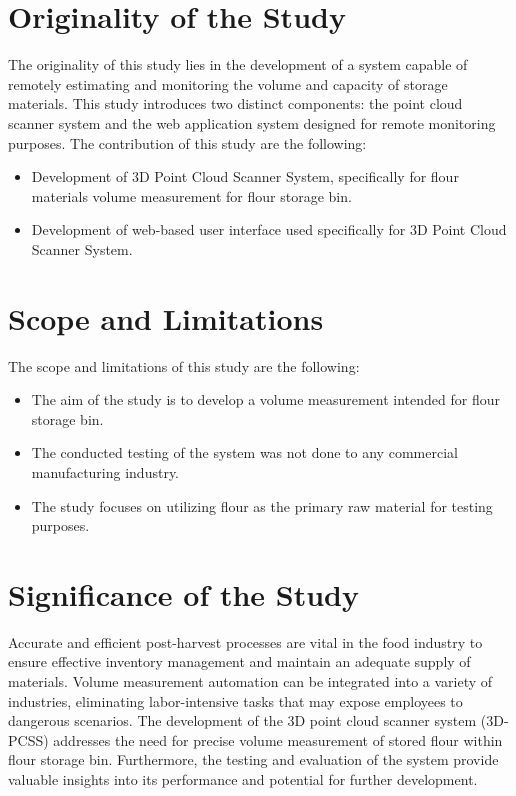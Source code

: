 \section{Originality of the Study}
\label{intro:sec:Originality of the Study}
The originality of this study lies in the development of a system capable of remotely estimating and monitoring the volume and capacity of storage materials. This study introduces two distinct components: the point cloud scanner system and the web application system designed for remote monitoring purposes. The contribution of this study are the following:

\begin{itemize}
	\item Development of 3D Point Cloud Scanner System, specifically for flour materials volume measurement for flour storage bin.
	\item Development of web-based user interface used specifically for 3D Point Cloud Scanner System.
\end{itemize}

\section{Scope and Limitations}
\label{intro:sec:Scope and Limitations}

The scope and limitations of this study are the following:

\begin{itemize}
	\item The aim of the study is to develop a volume measurement intended for flour storage bin.
	\item The conducted testing of the system was not done to any commercial manufacturing industry.
	\item The study focuses on utilizing flour as the primary raw material for testing purposes.
\end{itemize}

\section{Significance of the Study}
\label{intro:sec:Significance of the Study}

Accurate and efficient post-harvest processes are vital in the food industry to ensure effective inventory management and maintain an adequate supply of materials. Volume measurement automation can be integrated into a variety of industries, eliminating labor-intensive tasks that may expose employees to dangerous scenarios. The development of the 3D point cloud scanner system (3D-PCSS) addresses the need for precise volume measurement of stored flour within flour storage bin. Furthermore, the testing and evaluation of the system provide valuable insights into its performance and potential for further development.

